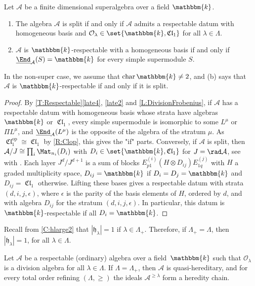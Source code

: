 \documentclass[a4paper,11pt]{amsart}
\newcommand{\uEnd}{\underline{\End}}
\numberwithin{equation}{subsection}
\theoremstyle{definition}
\theoremstyle{theorem}
\theoremstyle{remark}
\DeclareMathOperator\Cl{\mathfrak{Cl}}
\newcommand\CO{\mathcal{O}}
\newcommand\hlam[1][\lambda]{\mathfrak{h}_{#1}}
\newcommand\Olam[1][\lambda]{\CO_{#1}}
\newcommand\kk{\mathbbm{k}}
\begin{document}
\begin{Corollary}\label{C:Split}
  Let $\mathcal{A}$ be a finite dimensional superalgebra over a field
  $\kk$.
  \begin{enumerate}
  \item The algebra $\mathcal{A}$ is split if and only if $\mathcal{A}$ admits a respectable datum with homogeneous basis and $\Olam\in\set{\kk,\Cl_1}$ for all $\lambda\in\Lambda$.
  \item $\mathcal{A}$ is $\kk$-respectable with a homogeneous basis if and only if $\uEnd_{\mathcal{A}}(S)=\kk$ for every simple supermodule $S$.
  \end{enumerate}
  In the non-super case, we assume that $\operatorname{char}\kk\ne2$, and (b) says that $\mathcal{A}$ is $\kk$-respectable if and only if it is split.
\end{Corollary}

\begin{proof}
  By \autoref{T:Respectable}\autoref{late4}, \autoref{late2} and \autoref{L:DivisionFrobenius}, if $\mathcal{A}$ has a respectable datum with homogeneous basis whose strata have algebras $\kk$ or $\Cl_1$, every simple supermodule is isomorphic to some $L^\mu$ or $\Pi L^\mu$, and $\uEnd_{\mathcal{A}}(L^\mu)$ is the opposite of the algebra of the stratum $\mu$. As $\Cl_1^{\mathrm{op}}\cong\Cl_1$ by \autoref{R:Clop}, this gives the "if" parts. Conversely, if $\mathcal{A}$ is split, then $\mathcal{A}/J\cong\prod_i\Mat_{n_i}(D_i)$ with $D_i\in\set{\kk,\Cl_1}$ for $J=\rad\mathcal{A}$, see \cite[Theorem~(2.6) and Remark~(2.7)]{Jozefiak} with \cite{Wall:GradedBrauer}.  Each layer $J^d/J^{d+1}$ is a sum of blocks $E^{(i)}_{p1}(H\otimes D_{ij})E^{(j)}_{1q}$ with $H$ a graded multiplicity space, $D_{ij}=\kk$ if $D_i=D_j=\kk$ and $D_{ij}=\Cl_1$ otherwise. Lifting these bases gives a respectable datum with strata $(d,i,j,\epsilon)$, where $\epsilon$ is the parity of the basis elements of $H$, ordered by $d$, and with algebra $D_{ij}$ for the stratum $(d,i,j,\epsilon)$. In particular, this datum is $\kk$-respectable if all $D_i=\kk$.
\end{proof}

Recall from \autoref{C:hlarge2} that $|\hlam|=1$ if
$\lambda\in\Lambda_+$. Therefore, if $\Lambda_+=\Lambda$, then
$|\hlam|=1$, for all $\lambda\in\Lambda$.

\begin{Corollary}\label{C:quasihereditary}
  Let $\mathcal{A}$ be a respectable (ordinary) algebra over a field~$\kk$ such that $\Olam$ is a division algebra for all $\lambda\in\Lambda$. If $\Lambda=\Lambda_+$, then $\mathcal{A}$ is quasi-hereditary, and for every total order refining $(\Lambda,\ge)$ the ideals $\mathcal{A}^{\ge\lambda}$ form a heredity chain.
\end{Corollary}
\end{document}
